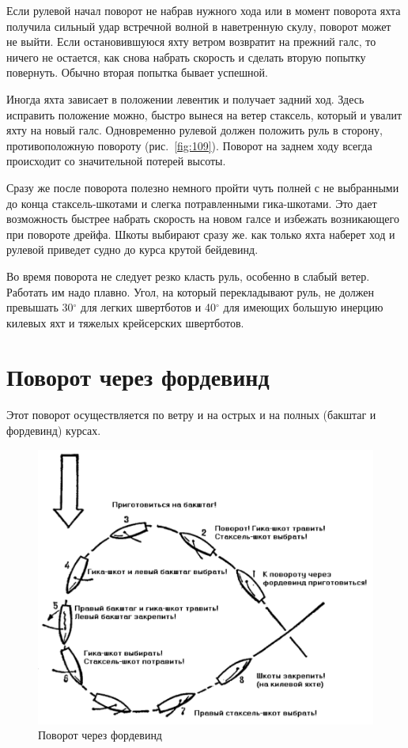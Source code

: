 \documentclass[a4paper, 12pt, twoside, final]{scrbook}
\begin{document}
Если рулевой начал поворот не набрав нужного хода или в момент поворота яхта получила сильный удар встречной волной в наветренную скулу, поворот может не выйти. Если остановившуюся яхту ветром возвратит на прежний галс, то ничего не остается, как снова набрать скорость и сделать вторую попытку повернуть. Обычно вторая попытка бывает успешной.

Иногда яхта зависает в положении левентик и получает задний ход. Здесь исправить положение можно, быстро вынеся на ветер стаксель, который и увалит яхту на новый галс. Одновременно рулевой должен положить руль в сторону, противоположную повороту (рис.~\ref{fig:109}). Поворот на заднем ходу всегда происходит со значительной потерей высоты.

Сразу же после поворота полезно немного пройти чуть полней с не выбранными до конца стаксель-шкотами и слегка потравленными гика-шкотами. Это дает возможность быстрее набрать скорость на новом галсе и избежать возникающего при повороте дрейфа. Шкоты выбирают сразу же. как только яхта наберет ход и рулевой приведет судно до курса крутой бейдевинд.

Во время поворота не следует резко класть руль, особенно в слабый ветер. Работать им надо плавно. Угол, на который перекладывают руль, не должен превышать 30$^\circ$ для легких швертботов и 40$^\circ$ для имеющих большую инерцию килевых яхт и тяжелых крейсерских швертботов.

\section{Поворот через фордевинд}

Этот поворот осуществляется по ветру и на острых и на полных (бакштаг и фордевинд) курсах.

\begin{figure}[htbp]
   \centering
   \includegraphics{pics/110_Povorot_fordevind} %
   \caption{Поворот через фордевинд}
   \label{fig:110}
\end{figure}
\end{document}

